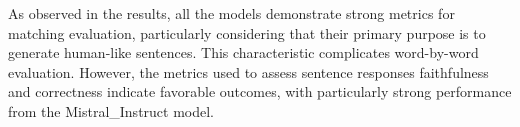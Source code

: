 As observed in the results, all the models demonstrate strong metrics for matching evaluation, particularly considering that their primary purpose is to generate human-like sentences. This characteristic complicates word-by-word evaluation. However, the metrics used to assess sentence responses faithfulness and correctness indicate favorable outcomes, with particularly strong performance from the Mistral\_Instruct model.
